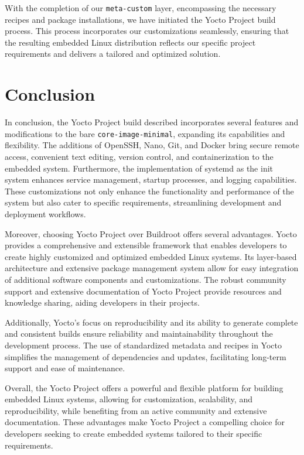 \documentclass[
12pt,
oneside, 
onehalfspacing, 
nolistspacing, 
parskip, 
chapterinoneline, 
]{AASTCOMPUTER}
\begin{document}
With the completion of our \texttt{meta-custom} layer, encompassing the necessary recipes and package installations, we have initiated the Yocto Project build process. This process incorporates our customizations seamlessly, ensuring that the resulting embedded Linux distribution reflects our specific project requirements and delivers a tailored and optimized solution.

\section{Conclusion}
In conclusion, the Yocto Project build described incorporates several features and modifications to the bare \texttt{core-image-minimal}, expanding its capabilities and flexibility. The additions of OpenSSH, Nano, Git, and Docker bring secure remote access, convenient text editing, version control, and containerization to the embedded system. Furthermore, the implementation of systemd as the init system enhances service management, startup processes, and logging capabilities. These customizations not only enhance the functionality and performance of the system but also cater to specific requirements, streamlining development and deployment workflows.

Moreover, choosing Yocto Project over Buildroot offers several advantages. Yocto provides a comprehensive and extensible framework that enables developers to create highly customized and optimized embedded Linux systems. Its layer-based architecture and extensive package management system allow for easy integration of additional software components and customizations. The robust community support and extensive documentation of Yocto Project provide resources and knowledge sharing, aiding developers in their projects.

Additionally, Yocto's focus on reproducibility and its ability to generate complete and consistent builds ensure reliability and maintainability throughout the development process. The use of standardized metadata and recipes in Yocto simplifies the management of dependencies and updates, facilitating long-term support and ease of maintenance.

Overall, the Yocto Project offers a powerful and flexible platform for building embedded Linux systems, allowing for customization, scalability, and reproducibility, while benefiting from an active community and extensive documentation. These advantages make Yocto Project a compelling choice for developers seeking to create embedded systems tailored to their specific requirements.
\end{document}
